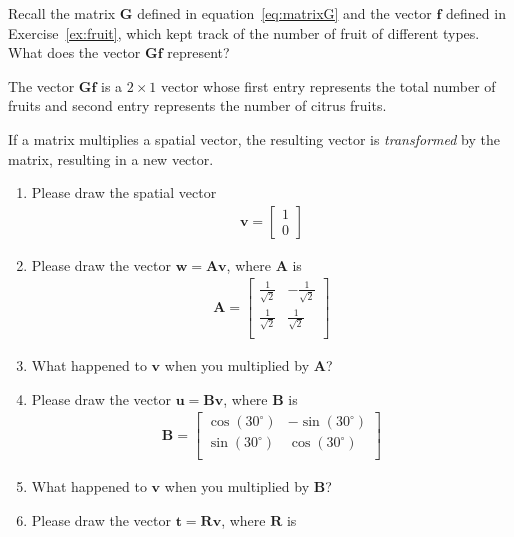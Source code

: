 \begin{prob}
Recall the matrix $\mathbf{G}$ defined in equation~\eqref{eq:matrixG} and the vector $\mathbf{f}$ defined in Exercise~\ref{ex:fruit}, which kept track of the number of fruit of different types. What does the vector $\mathbf{G}\mathbf{f}$ represent?
\end{prob}

\begin{sol}
The vector $\mathbf{G}\mathbf{f}$ is a $2 \times 1$ vector whose first entry represents the total number of fruits and second entry represents the number of citrus fruits.
\end{sol}

\begin{prob}
If a matrix multiplies a spatial vector, the resulting vector is \emph{transformed} by the matrix, resulting in a new vector.
    \begin{enumerate}
    \item Please draw the spatial vector
    \begin{align}
    \mathbf{v} = \begin{bmatrix} 1 \\ 0 \end{bmatrix}
    \end{align}
    \item Please draw the vector $\mathbf{w} = \mathbf{Av}$, where $\mathbf{A}$ is
    \begin{align}
    \mathbf{A} =  \begin{bmatrix}
\frac{1}{\sqrt 2} & - \frac{1}{\sqrt 2} \\
\frac{1}{\sqrt 2} & \frac{1}{\sqrt 2} \\
\end{bmatrix}
\end{align}
\item What happened to $\mathbf{v}$ when you multiplied by $\mathbf{A}$?
\item Please draw the vector $\mathbf{u} = \mathbf{Bv}$, where $\mathbf{B}$ is
\begin{align}
\mathbf{B} =
\begin{bmatrix}
\cos(30^\circ) & -\sin(30^\circ) \\
\sin(30^\circ) & \cos(30^\circ) \\
\end{bmatrix}
\end{align}
\item What happened to $\mathbf{v}$ when you multiplied by $\mathbf{B}$?
\item Please draw the vector $\mathbf{t} = \mathbf{Rv}$, where $\mathbf{R}$ is

\end{enumerate}
\end{prob}
